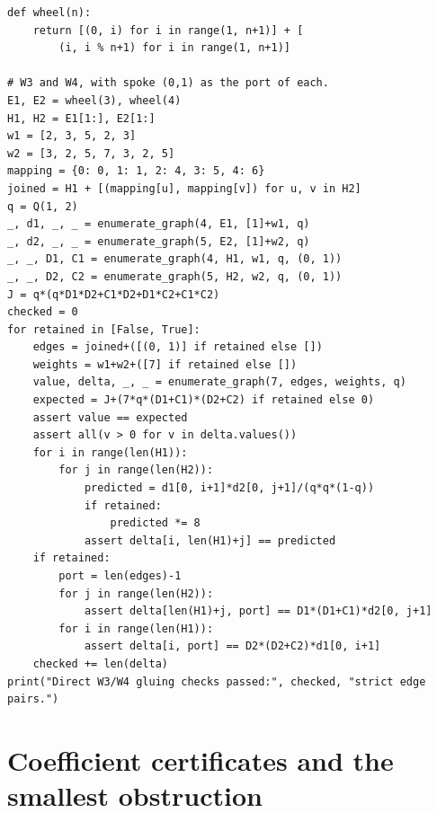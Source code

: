 \documentclass[11pt,a4paper]{article}
\theoremstyle{definition}
\theoremstyle{remark}\newtheorem{remark}[theorem]{Remark}
\begin{document}
\begin{lstlisting}
def wheel(n):
    return [(0, i) for i in range(1, n+1)] + [
        (i, i % n+1) for i in range(1, n+1)]

# W3 and W4, with spoke (0,1) as the port of each.
E1, E2 = wheel(3), wheel(4)
H1, H2 = E1[1:], E2[1:]
w1 = [2, 3, 5, 2, 3]
w2 = [3, 2, 5, 7, 3, 2, 5]
mapping = {0: 0, 1: 1, 2: 4, 3: 5, 4: 6}
joined = H1 + [(mapping[u], mapping[v]) for u, v in H2]
q = Q(1, 2)
_, d1, _, _ = enumerate_graph(4, E1, [1]+w1, q)
_, d2, _, _ = enumerate_graph(5, E2, [1]+w2, q)
_, _, D1, C1 = enumerate_graph(4, H1, w1, q, (0, 1))
_, _, D2, C2 = enumerate_graph(5, H2, w2, q, (0, 1))
J = q*(q*D1*D2+C1*D2+D1*C2+C1*C2)
checked = 0
for retained in [False, True]:
    edges = joined+([(0, 1)] if retained else [])
    weights = w1+w2+([7] if retained else [])
    value, delta, _, _ = enumerate_graph(7, edges, weights, q)
    expected = J+(7*q*(D1+C1)*(D2+C2) if retained else 0)
    assert value == expected
    assert all(v > 0 for v in delta.values())
    for i in range(len(H1)):
        for j in range(len(H2)):
            predicted = d1[0, i+1]*d2[0, j+1]/(q*q*(1-q))
            if retained:
                predicted *= 8
            assert delta[i, len(H1)+j] == predicted
    if retained:
        port = len(edges)-1
        for j in range(len(H2)):
            assert delta[len(H1)+j, port] == D1*(D1+C1)*d2[0, j+1]
        for i in range(len(H1)):
            assert delta[i, port] == D2*(D2+C2)*d1[0, i+1]
    checked += len(delta)
print("Direct W3/W4 gluing checks passed:", checked, "strict edge pairs.")
\end{lstlisting}

\clearpage\section{Coefficient certificates and the smallest obstruction}
\end{document}

